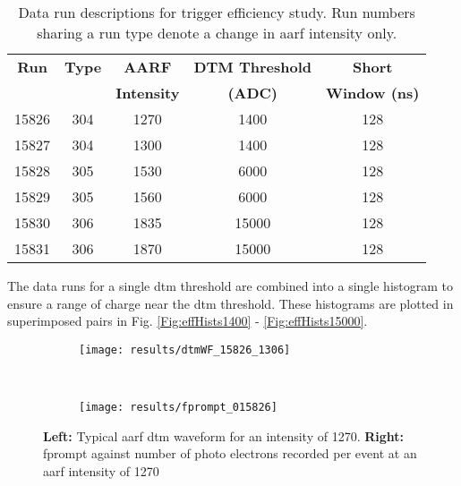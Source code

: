\begin{table}[h]
\centering
\caption{Data run descriptions for trigger efficiency study. Run numbers sharing a run type denote a change in \gls{aarf} intensity only.}
\vspace{.2cm}

\begin{tabular}{c	c	c	c	c}
\hline
\hline

\textbf{Run}&	\textbf{Type}&		\textbf{AARF}& \textbf{DTM Threshold}&	\textbf{Short}\\
&	&		\textbf{Intensity}& \textbf{(ADC)}&	\textbf{Window (ns)}\\

\hline
15826&	304&	1270&		1400 &	128\\
15827&	304&	1300&		1400 &	128\\
15828&	305&	1530&		6000 &	128\\
15829&	305&	1560&		6000 &	128\\
15830&	306&	1835&		15000 &	128\\
15831&	306&	1870&		15000 &	128\\

\hline
\hline
\end{tabular}
\label{Table:runDescrip}
\end{table}

The data runs for a single \gls{dtm} threshold are combined into a single histogram to ensure a range of charge near the \gls{dtm} threshold. These histograms are plotted in superimposed pairs in Fig. \ref{Fig:effHists1400} - \ref{Fig:effHists15000}.

\clearpage
\begin{figure}
    \centering
    \begin{subfigure}[t]{0.48\textwidth}
		\texttt{[image: results/dtmWF\_15826\_1306]}
		\label{Fig:wfShort} 
    \end{subfigure}
    ~ %
    \begin{subfigure}[t]{0.48\textwidth}
        \texttt{[image: results/fprompt\_015826]}
        \label{Fig:fprompt15826}
    \end{subfigure}
    \caption{\textbf{Left:} Typical \gls{aarf} \gls{dtm} waveform for an intensity of 1270. \textbf{Right:} \gls{fprompt} against number of photo electrons recorded per event at an \gls{aarf} intensity of 1270}
	\label{Fig:wf_Fprompt_low}
\end{figure}


